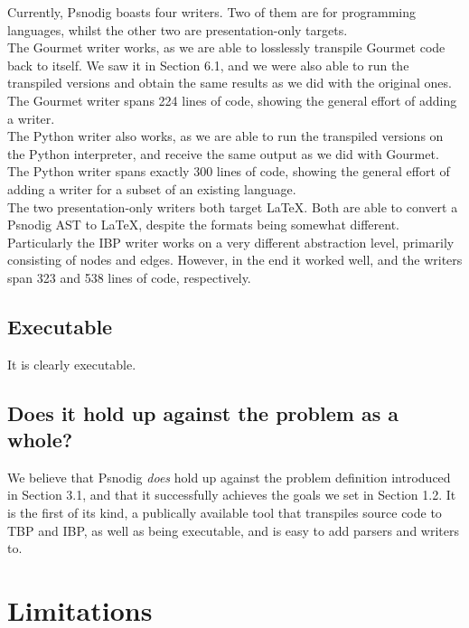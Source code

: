 
Currently, Psnodig boasts four writers. Two of them are for programming languages, whilst the other two are presentation-only targets. \\

The Gourmet writer works, as we are able to losslessly transpile Gourmet code back to itself. We saw it in Section 6.1, and we were also able to run the transpiled versions and obtain the same results as we did with the original ones. The Gourmet writer spans 224 lines of code, showing the general effort of adding a writer. \\

The Python writer also works, as we are able to run the transpiled versions on the Python interpreter, and receive the same output as we did with Gourmet. The Python writer spans exactly 300 lines of code, showing the general effort of adding a writer for a subset of an existing language. \\

The two presentation-only writers both target LaTeX. Both are able to convert a Psnodig AST to LaTeX, despite the formats being somewhat different. Particularly the IBP writer works on a very different abstraction level, primarily consisting of nodes and edges. However, in the end it worked well, and the writers span 323 and 538 lines of code, respectively.

\subsection{Executable}

It is clearly executable.

\subsection{Does it hold up against the problem as a whole?}

We believe that Psnodig \textit{does} hold up against the problem definition introduced in Section 3.1, and that it successfully achieves the goals we set in Section 1.2. It is the first of its kind, a publically available tool that transpiles source code to TBP and IBP, as well as being executable, and is easy to add parsers and writers to.

\section{Limitations}

